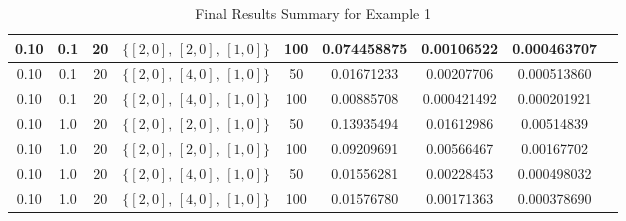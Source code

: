 \documentclass[conference]{IEEEtran}
\begin{document}
\begin{table}[ht]
{\begin{tabular}{|c|c|c|c|c|c|c|c|c|}
            0.10           & 0.1                    & 20            & $\{[2,0],\,[2,0],\,[1,0]\}$ & 100            & 0.074458875             & 0.00106522             & 0.000463707            \\ \hline
            0.10           & 0.1                    & 20            & $\{[2,0],\,[4,0],\,[1,0]\}$ & 50             & 0.01671233              & 0.00207706             & 0.000513860            \\ \hline
            0.10           & 0.1                    & 20            & $\{[2,0],\,[4,0],\,[1,0]\}$ & 100            & 0.00885708              & 0.000421492            & 0.000201921            \\ \hline
            0.10           & 1.0                    & 20            & $\{[2,0],\,[2,0],\,[1,0]\}$ & 50             & 0.13935494              & 0.01612986             & 0.00514839             \\ \hline
            0.10           & 1.0                    & 20            & $\{[2,0],\,[2,0],\,[1,0]\}$ & 100            & 0.09209691              & 0.00566467             & 0.00167702             \\ \hline
            0.10           & 1.0                    & 20            & $\{[2,0],\,[4,0],\,[1,0]\}$ & 50             & 0.01556281              & 0.00228453             & 0.000498032            \\ \hline
            0.10           & 1.0                    & 20            & $\{[2,0],\,[4,0],\,[1,0]\}$ & 100            & 0.01576780              & 0.00171363             & 0.000378690            \\ \hline
        \end{tabular}%
    }
    \caption{Final Results Summary for Example 1}
    \label{tab:final_results}
\end{table}
\end{document}
